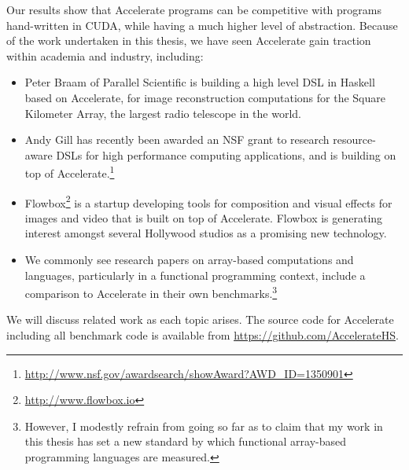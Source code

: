 Our results show that Accelerate programs can be competitive with programs
hand-written in CUDA\cuda{}, while having a much higher level of abstraction.
Because of the work undertaken in this thesis, we have seen Accelerate gain
traction within academia and industry, including:

\begin{itemize}
    \item Peter Braam of Parallel Scientific is building a high level DSL in
        Haskell based on Accelerate, for image reconstruction computations for
        the Square Kilometer Array, the largest radio telescope in the world.

    \item Andy Gill has recently been awarded an NSF grant to research
        resource-aware DSLs for high performance computing applications, and is
        building on top of Accelerate.\footnote{\url{http://www.nsf.gov/awardsearch/showAward?AWD_ID=1350901}}

    \item Flowbox\footnote{\url{http://www.flowbox.io}} is a startup developing
        tools for composition and visual effects for images and video that is
        built on top of Accelerate. Flowbox is generating interest amongst
        several Hollywood studios as a promising new technology.


    \item We commonly see research papers on array-based computations and
        languages, particularly in a functional programming context, include a
        comparison to Accelerate in their own benchmarks.\footnote{However, I
        modestly refrain from going so far as to claim that my work in this
        thesis has set a new standard by which functional array-based
        programming languages are measured.}

\end{itemize}

We will discuss related work as each topic arises. The source code for
Accelerate including all benchmark code is available from
\url{https://github.com/AccelerateHS}.



